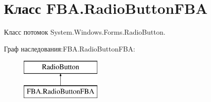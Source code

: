 \hypertarget{class_f_b_a_1_1_radio_button_f_b_a}{}\section{Класс F\+B\+A.\+Radio\+Button\+F\+BA}
\label{class_f_b_a_1_1_radio_button_f_b_a}


Класс потомок System.\+Windows.\+Forms.\+Radio\+Button.  


Граф наследования\+:F\+B\+A.\+Radio\+Button\+F\+BA\+:\begin{figure}[H]
\begin{center}
\leavevmode
\includegraphics[height=2.000000cm]{class_f_b_a_1_1_radio_button_f_b_a}
\end{center}
\end{figure}

